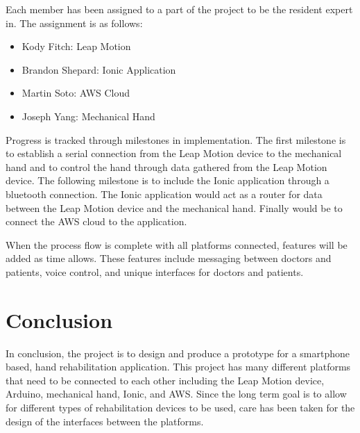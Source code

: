 \documentclass[a4paper,10pt]{article}
\begin{document}
            Each member has been assigned to a part of the project to be the resident expert in. The assignment is as follows:
        \begin{itemize}
         \item Kody Fitch: Leap Motion
         \item Brandon Shepard: Ionic Application
         \item Martin Soto: AWS Cloud
         \item Joseph Yang: Mechanical Hand
        \end{itemize}

            Progress is tracked through milestones in implementation. The first milestone is to establish a serial connection from the Leap Motion device to the mechanical hand and to control the hand through data gathered from the Leap Motion device. The following milestone is to include the Ionic application through a bluetooth connection. The Ionic application would act as a router for data between the Leap Motion device and the mechanical hand. Finally would be to connect the AWS cloud to the application.

            When the process flow is complete with all platforms connected, features will be added as time allows. These features include messaging between doctors and patients, voice control, and unique interfaces for doctors and patients.

\section{Conclusion}

          In conclusion, the project is to design and produce a prototype for a smartphone based, hand rehabilitation application. This project has many different platforms that need to be connected to each other including the Leap Motion device, Arduino, mechanical hand, Ionic, and AWS. Since the long term goal is to allow for different types of rehabilitation devices to be used, care has been taken for the design of the interfaces between the platforms.
\end{document}
